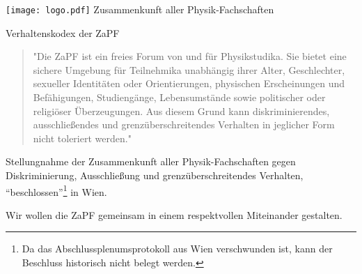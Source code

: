 \documentclass[DIV=calc]{scrartcl}
\begin{document}
\hspace{0.87\textwidth}
\begin{minipage}{120pt}
	\vspace{-1.8cm}
	\texttt{[image: logo.pdf]}
	\centering
	\small Zusammenkunft aller Physik-Fachschaften
\end{minipage}

\begin{center}
  \huge{Verhaltenskodex der ZaPF }\vspace{.25\baselineskip}\\
  \normalsize
\end{center}
\vspace{1cm}





\begin{quote}
	"Die ZaPF ist ein freies Forum von und für Physikstudika. Sie bietet eine
	sichere Umgebung für Teilnehmika unabhängig ihrer Alter, Geschlechter,
	sexueller Identitäten oder Orientierungen, physischen Erscheinungen und
	Befähigungen, Studiengänge, Lebensumstände sowie politischer oder
	religiöser Überzeugungen. Aus diesem Grund kann diskriminierendes,
	ausschließendes und grenzüberschreitendes Verhalten in jeglicher Form
	nicht toleriert werden."
\end{quote}

Stellungnahme der Zusammenkunft aller Physik-Fachschaften gegen
  Diskriminierung, Ausschließung und grenzüberschreitendes Verhalten,
  ``beschlossen''\footnote{Da das Abschlussplenumsprotokoll aus Wien
    verschwunden ist, kann der Beschluss historisch nicht belegt werden.}
  in Wien.

\vspace{1cm}

Wir wollen die ZaPF gemeinsam in einem respektvollen Miteinander
gestalten.
\end{document}
